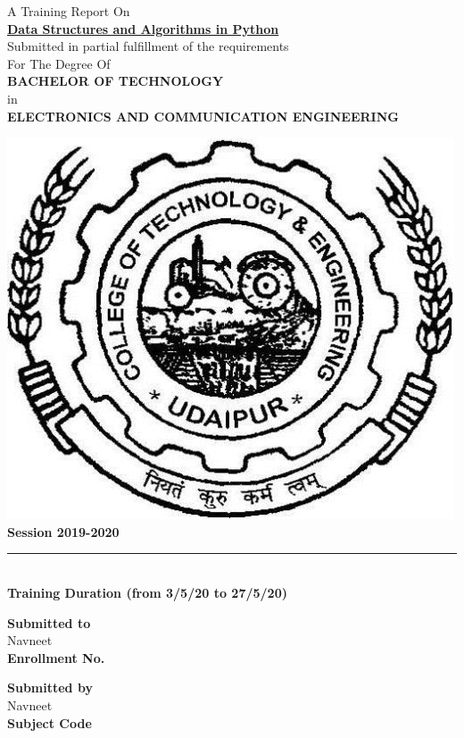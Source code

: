 \documentclass[a4paper,12pt]{report}
\begin{document}
\pagestyle{fancy}
\fancyhf{}
\rhead{\textit{\textsf{\leftmark}}}
\cfoot{\thepage}
\begin{center}
		\Large{A Training Report On}\\[0.5cm]
		\underline{\color{two}\textbf{\Large{Data Structures and Algorithms in Python}}}\\[1cm]

		\Large{Submitted in partial fulfillment of the
		requirements}\\[0.1cm]
		\Large{For The Degree Of }\\[0.1cm]
		\textbf{\large{BACHELOR OF TECHNOLOGY}}\\[0.1cm]
		\Large{in}\\[0.1cm]
		\textbf{\large{ELECTRONICS AND COMMUNICATION
		ENGINEERING}}\\[0.7cm]
\end{center}
\begin{center}
\includegraphics[scale=0.24]{"ctae.jpg"}\\[0.5cm]
		\textbf{Session 2019-2020}\\
		\rule{3cm}{0.3mm}\\[1mm]
		\textbf{Training Duration (from 3/5/20 to 27/5/20)}\\[1.8cm]
\end{center}
\begin{multicols}{2}
	\begin{flushleft}
		\large{\textbf{Submitted to}}\\
		\large{\textrm{Navneet}}\\[0.4cm]
		\large{\textbf{Enrollment No.}}\\
	\end{flushleft}
	\begin{flushright}
		\large{\textbf{Submitted by}}\\
		\textrm{Navneet}\\[0.4cm]
		\large{\textbf{Subject Code}}\\
	\end{flushright}
\end{multicols}
\end{document}

